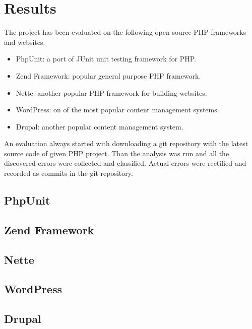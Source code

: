 \chapter{Results}

The project has been evaluated on the following open source PHP frameworks and 
websites.

\begin{itemize}
    \item PhpUnit: a port of JUnit unit testing framework for PHP. 
    \item Zend Framework: popular general purpose PHP framework.
    \item Nette: another popular PHP framework for building websites.
    \item WordPress: on of the most popular content management systems.
    \item Drupal: another popular content management system.
\end{itemize}

An evaluation always started with downloading a git repository with the 
latest source code of given PHP project. Than the analysis was run and 
all the discovered errors were collected and classified.
Actual errors were rectified and recorded as commits in 
the git repository. 

\section{PhpUnit}

\section{Zend Framework}

\section{Nette}

\section{WordPress}

\section{Drupal}

